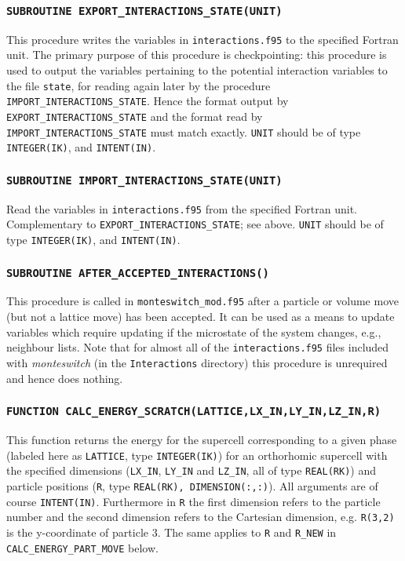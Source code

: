 \documentclass{report}
\begin{document}
\subsubsection{\texttt{SUBROUTINE EXPORT\_INTERACTIONS\_STATE(UNIT)}}
This procedure writes the variables in \texttt{interactions.f95} to the specified Fortran unit. The primary purpose of this procedure is checkpointing: 
this procedure is used to output the variables pertaining to the potential interaction variables to the file \texttt{state}, for reading again later
by the procedure \verb|IMPORT_INTERACTIONS_STATE|. Hence the format output by \verb|EXPORT_INTERACTIONS_STATE| and the format read by 
\verb|IMPORT_INTERACTIONS_STATE| must match exactly. \verb|UNIT| should be of type \verb|INTEGER(IK)|, and \verb|INTENT(IN)|.

\subsubsection{\texttt{SUBROUTINE IMPORT\_INTERACTIONS\_STATE(UNIT)}}
Read the variables in \texttt{interactions.f95} from the specified Fortran unit. Complementary to \verb|EXPORT_INTERACTIONS_STATE|; see 
above. \verb|UNIT| should be of type \verb|INTEGER(IK)|, and \verb|INTENT(IN)|.

\subsubsection{\texttt{SUBROUTINE AFTER\_ACCEPTED\_INTERACTIONS()}}
This procedure is called in \texttt{monteswitch\_mod.f95} after a particle or volume move (but not a lattice move) has been accepted. It can be used 
as a means to update variables which require updating if the microstate of the system changes, e.g., neighbour lists. Note that for almost all of
the \texttt{interactions.f95} files included with \emph{monteswitch} (in the \texttt{Interactions} directory) this procedure is unrequired and hence
does nothing.

\subsubsection{\texttt{FUNCTION CALC\_ENERGY\_SCRATCH(LATTICE,LX\_IN,LY\_IN,LZ\_IN,R)}}
This function returns the energy for the supercell corresponding to a given phase (labeled here as \verb|LATTICE|, type \verb|INTEGER(IK)|) for 
an orthorhomic supercell with the specified dimensions (\verb|LX_IN|, \verb|LY_IN| and \verb|LZ_IN|, all of type \verb|REAL(RK)|) and particle 
positions (\verb|R|, type \verb|REAL(RK), DIMENSION(:,:)|). All arguments are of course \verb|INTENT(IN)|. Furthermore in \verb|R| the first dimension
refers to the particle number and the second dimension refers to the Cartesian dimension, e.g. \verb|R(3,2)| is the y-coordinate of particle 3.
The same applies to \verb|R| and \verb|R_NEW| in \verb|CALC_ENERGY_PART_MOVE| below. 
\end{document}
